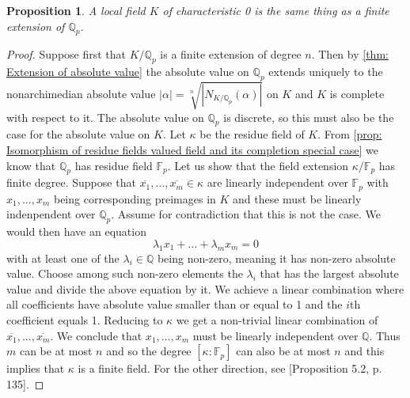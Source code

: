 \documentclass{article}
\newtheorem{proposition}{Proposition}[section]
\newcommand{\mfrak}[1]{\mathfrak{#1}}
\newcommand{\mbb}[1]{\mathbb{#1}}
\numberwithin{equation}{section}
\begin{document}
\begin{proposition}\label{prop: Characterization of local fields}
    A local field $K$ of characteristic 0 is the same thing as a finite extension of $\mbb Q_p$.
\end{proposition}
\begin{proof}
    Suppose first that $K /\mbb Q_p$ is a finite extension of degree $n$. Then by \cref{thm: Extension of absolute value} the absolute value on $\mbb Q_p$ extends uniquely to the nonarchimedian absolute value $|\alpha| = \sqrt[n]{|N_{K/\mbb Q_p}(\alpha)|}$ on $K$ and $K$ is complete with respect to it. The absolute value on $\mbb Q_p$ is discrete, so this must also be the case for the absolute value on $K$. Let $\kappa$ be the residue field of $K$. From \cref{prop: Isomorphism of residue fields valued field and its completion special case} we know that $\mbb Q_p$ has residue field $\mbb F_p$. Let us show that the field extension $\kappa / \mbb F_p$ has finite degree. Suppose that $\overline {x_1}, ..., \overline{x_m} \in \kappa$ are linearly independent over $\mbb F_p$ with $x_1, ..., x_m$ being corresponding preimages in $K$ and these must be linearly indenpendent over $\mbb Q_p$. Assume for contradiction that this is not the case. We would then have an equation
    $$\lambda_1 x_1 + ... + \lambda_m x_m = 0$$
    with at least one of the $\lambda_i \in \mbb Q$ being non-zero, meaning it has non-zero absolute value. Choose among such non-zero elements the $\lambda_i$ that has the largest absolute value and divide the above equation by it. We achieve a linear combination where all coefficients have absolute value smaller than or equal to 1 and the $i$th coefficient equals 1. Reducing to $\kappa$ we get a non-trivial linear combination of $\overline{x_1}, ..., \overline{x_m}$. We conclude that $x_1, ..., x_m$ must be linearly independent over $\mbb Q$. Thus $m$ can be at most $n$ and so the degree $[\kappa : \mbb F_p]$ can also be at most $n$ and this implies that $\kappa$ is a finite field. For the other direction, see \citep{neukirch}[Proposition 5.2, p. 135]. 


\end{proof}
\end{document}
